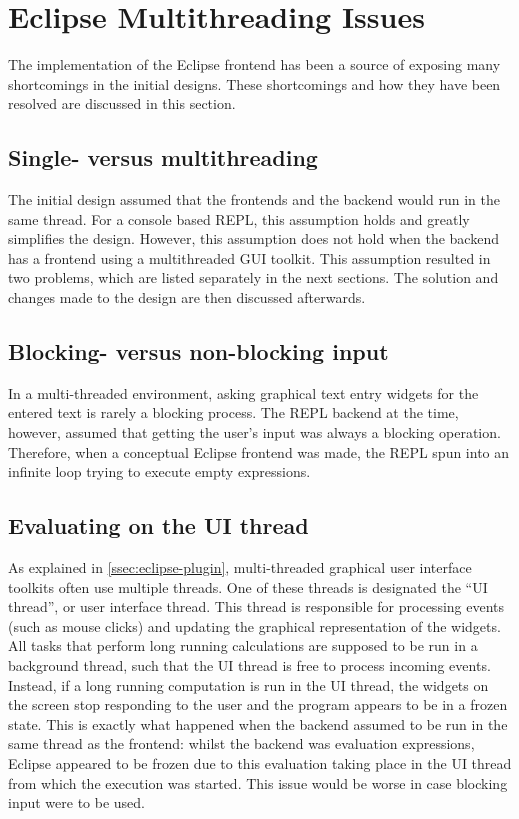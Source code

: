 \section{Eclipse Multithreading Issues}
\label{sec:eclipse-multithread}

The implementation of the Eclipse frontend has been a source of exposing many
shortcomings in the initial designs. These shortcomings and how they have been
resolved are discussed in this section.

\subsection{Single- versus multithreading}

The initial design assumed that the frontends and the backend would run in the
same thread. For a console based REPL, this assumption holds and greatly
simplifies the design. However, this assumption does not hold when the backend
has a frontend using a multithreaded GUI toolkit. This
assumption resulted in two problems, which are listed separately in the next
sections. The solution and changes made to the design are then discussed
afterwards.

\subsection{Blocking- versus non-blocking input}

In a multi-threaded environment, asking graphical text entry widgets for the
entered text is rarely a blocking process. The REPL backend at the time,
however, assumed that getting the user's input was always a blocking operation.
Therefore, when a conceptual Eclipse frontend was made, the REPL spun into an
infinite loop trying to execute empty expressions.

\subsection{Evaluating on the UI thread}

As explained in \cref{ssec:eclipse-plugin}, multi-threaded graphical user
interface toolkits often use multiple threads. One of these threads is
designated the ``UI thread'', or user interface thread. This thread is
responsible for processing events (such as mouse clicks) and updating the
graphical representation of the widgets. All tasks that perform long running
calculations are supposed to be run in a background thread, such that the UI
thread is free to process incoming events. Instead, if a long running
computation is run in the UI thread, the widgets on the screen stop responding
to the user and the program appears to be in a frozen state. This is exactly
what happened when the backend assumed to be run in the same thread as the
frontend: whilst the backend was evaluation expressions, Eclipse appeared to be
frozen due to this evaluation taking place in the UI thread from which the
execution was started. This issue would be worse in case blocking input
were to be used.

